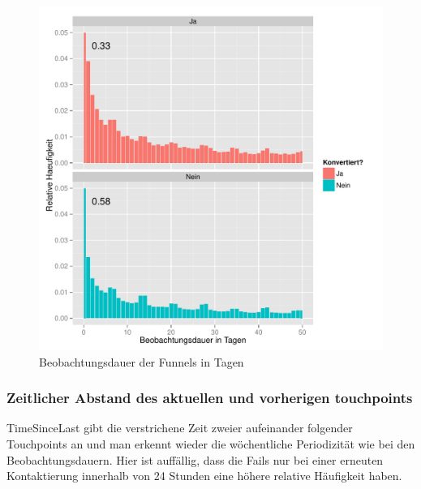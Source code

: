 \begin{figure}[H]
    \centering
    \includegraphics[scale=0.5]{timeSinceFirst_Last.pdf}
    \caption{Beobachtungsdauer der Funnels in Tagen}
    \label{Fig_8}
\end{figure}




\subsubsection*{Zeitlicher Abstand des aktuellen und vorherigen touchpoints}
TimeSinceLast gibt die verstrichene Zeit zweier aufeinander folgender Touchpoints an und man erkennt wieder die wöchentliche Periodizität wie bei den Beobachtungsdauern. Hier ist auffällig, dass die Fails nur bei einer erneuten Kontaktierung innerhalb von 24 Stunden eine höhere relative Häufigkeit haben. 

